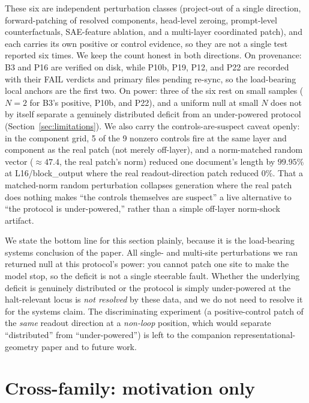 \documentclass[11pt]{article}
\begin{document}
These six are independent perturbation classes (project-out of a single direction,
forward-patching of resolved components, head-level zeroing, prompt-level counterfactuals,
SAE-feature ablation, and a multi-layer coordinated patch), and each carries its own
positive or control evidence, so they are not a single test reported six times. We keep the
count honest in both directions. On provenance: B3 and P16 are verified on disk, while
P10b, P19, P12, and P22 are recorded with their FAIL verdicts and primary files pending
re-sync, so the load-bearing local anchors are the first two. On power: three of the six
rest on small samples ($N=2$ for B3's positive, P10b, and P22), and a uniform null at small
$N$ does not by itself separate a genuinely distributed deficit from an under-powered
protocol (Section~\ref{sec:limitations}). We also carry the controls-are-suspect caveat
openly: in the component grid, 5 of the 9 nonzero controls fire at the same layer and
component as the real patch (not merely off-layer), and a norm-matched random vector
($\approx 47.4$, the real patch's norm) reduced one document's length by $99.95\%$ at
L16/block\_output where the real readout-direction patch reduced $0\%$. That a matched-norm
random perturbation collapses generation where the real patch does nothing makes ``the
controls themselves are suspect'' a live alternative to ``the protocol is under-powered,''
rather than a simple off-layer norm-shock artifact.

We state the bottom line for this section plainly, because it is the load-bearing systems
conclusion of the paper. All single- and multi-site perturbations we ran returned null at
this protocol's power: you cannot patch one site to make the model stop, so the deficit is
not a single steerable fault. Whether the underlying deficit is genuinely distributed or
the protocol is simply under-powered at the halt-relevant locus is \emph{not resolved} by
these data, and we do not need to resolve it for the systems claim. The discriminating
experiment (a positive-control patch of the \emph{same} readout direction at a
\emph{non-loop} position, which would separate ``distributed'' from ``under-powered'') is
left to the companion representational-geometry paper and to future work.

\section{Cross-family: motivation only}
\label{sec:crossfamily}
\end{document}
